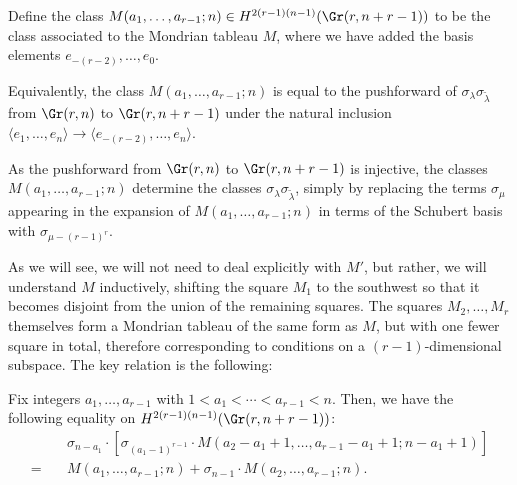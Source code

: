 \begin{figure}
\end{figure}

\begin{defi}
Define the class $M(a_1,\ldots,a_{r-1};n)\in H^{2(r-1)(n-1)}(\Gr(r,n+r-1))$ to be the class associated to the Mondrian tableau $M$, where we have added the basis elements $e_{-(r-2)},\ldots,e_0$.

Equivalently, the class $M(a_1,\ldots,a_{r-1};n)$ is equal to the pushforward of $\sigma_{\lambda}\sigma_{\widetilde{\lambda}}$ from $\Gr(r,n)$ to $\Gr(r,n+r-1)$ under the natural inclusion $\langle e_{1},\ldots,e_n\rangle\to \langle e_{-(r-2)},\ldots,e_n\rangle$.
\end{defi}

As the pushforward from $\Gr(r,n)$ to $\Gr(r,n+r-1)$ is injective, the classes $M(a_1,\ldots,a_{r-1};n)$ determine the classes $\sigma_{\lambda}\sigma_{\widetilde{\lambda}}$, simply by replacing the terms $\sigma_\mu$ appearing in the expansion of $M(a_1,\ldots,a_{r-1};n)$ in terms of the Schubert basis with $\sigma_{\mu-(r-1)^r}$.

As we will see, we will not need to deal explicitly with $M'$, but rather, we will understand $M$ inductively, shifting the square $M_1$ to the southwest so that it becomes disjoint from the union of the remaining squares. The squares $M_2,\ldots,M_r$ themselves form a Mondrian tableau of the same form as $M$, but with one fewer square in total, therefore corresponding to conditions on a $(r-1)$-dimensional subspace. The key relation is the following:

\begin{prop}\label{one_step}
Fix integers $a_1,\ldots,a_{r-1}$ with $1<a_1<\cdots<a_{r-1}<n$. Then, we have the following equality on $H^{2(r-1)(n-1)}(\Gr(r,n+r-1))$:
\begin{align*}
&\sigma_{n-a_1}\cdot [\sigma_{(a_1-1)^{r-1}}\cdot M(a_2-a_1+1,\ldots,a_{r-1}-a_1+1;n-a_1+1)]\\
=\quad &M(a_1,\ldots,a_{r-1};n)+\sigma_{n-1}\cdot M(a_2,\ldots,a_{r-1};n).
\end{align*}
\end{prop}

